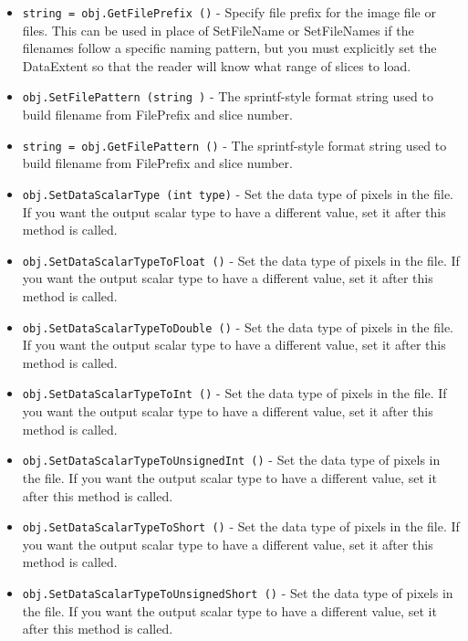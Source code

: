 \begin{itemize}
\item  \verb|string = obj.GetFilePrefix ()| -  Specify file prefix for the image file or files.  This can be
 used in place of SetFileName or SetFileNames if the filenames
 follow a specific naming pattern, but you must explicitly set
 the DataExtent so that the reader will know what range of slices
 to load.

\item  \verb|obj.SetFilePattern (string )| -  The sprintf-style format string used to build filename from
 FilePrefix and slice number.

\item  \verb|string = obj.GetFilePattern ()| -  The sprintf-style format string used to build filename from
 FilePrefix and slice number.

\item  \verb|obj.SetDataScalarType (int type)| -  Set the data type of pixels in the file.  
 If you want the output scalar type to have a different value, set it
 after this method is called.

\item  \verb|obj.SetDataScalarTypeToFloat ()| -  Set the data type of pixels in the file.  
 If you want the output scalar type to have a different value, set it
 after this method is called.

\item  \verb|obj.SetDataScalarTypeToDouble ()| -  Set the data type of pixels in the file.  
 If you want the output scalar type to have a different value, set it
 after this method is called.

\item  \verb|obj.SetDataScalarTypeToInt ()| -  Set the data type of pixels in the file.  
 If you want the output scalar type to have a different value, set it
 after this method is called.

\item  \verb|obj.SetDataScalarTypeToUnsignedInt ()| -  Set the data type of pixels in the file.  
 If you want the output scalar type to have a different value, set it
 after this method is called.

\item  \verb|obj.SetDataScalarTypeToShort ()| -  Set the data type of pixels in the file.  
 If you want the output scalar type to have a different value, set it
 after this method is called.

\item  \verb|obj.SetDataScalarTypeToUnsignedShort ()| -  Set the data type of pixels in the file.  
 If you want the output scalar type to have a different value, set it
 after this method is called.


\end{itemize}
